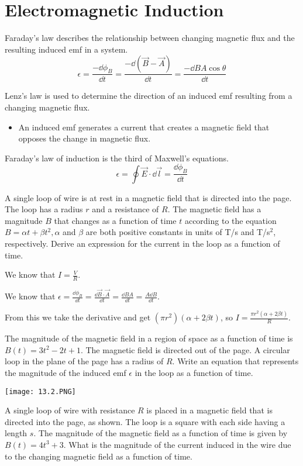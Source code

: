 \documentclass[../em.tex]{subfiles}
\begin{document}
\section{Electromagnetic Induction}
Faraday's law describes the relationship between changing magnetic flux and the resulting induced emf in a system.
\[\epsilon = \frac{-\dd\phi_B}{\dd t} = \frac{-\dd(\vec{B}-\vec{A})}{\dd t} = \frac{-\dd BA\cos\theta}{\dd t}\]

Lenz's law is used to determine the direction of an induced emf resulting from a changing magnetic flux.
\begin{itemize}
    \item An induced emf generates a current that creates a magnetic field that opposes the change in magnetic flux.
\end{itemize}

Faraday's law of induction is the third of Maxwell's equations.
\[ \epsilon = \oint \vec{E}\cdot\dd \vec{l} = \frac{\dd \phi_B}{\dd t}\]

\begin{example}
    A single loop of wire is at rest in a magnetic field that is directed into the page. The loop has a radius $r$ and a resistance of $R$. The magnetic field has a magnitude $B$ that changes 
    as a function of time $t$ according to the equation $B=\alpha t+\beta t^2, \alpha$ and $\beta$ are both positive constants in units of T/s and T/s$^2$, respectively. Derive an expression for the current in the loop as a function of time.

    We know that $I=\frac{V}{R}$.

    We know that $\epsilon = \frac{\dd \phi_B}{\dd t}=\frac{\dd \vec{B}\cdot \vec{A}}{\dd t}=\frac{\dd BA}{\dd t}=\frac{A\dd B}{\dd t}$.

    From this we take the derivative and get $(\pi r^2)(\alpha + 2\beta t)$, so $I=\frac{\pi r^2(\alpha +2\beta t)}{R}$.
\end{example}

\ex The magnitude of the magnetic field in a region of space as a function of time is $B(t)=3t^2-2t+1$. The magnetic field is directed out of the page. A circular loop in the plane of the page has a radius of $R$.
Write an equation that represents the magnitude of the induced emf $\epsilon$ in the loop as a function of time.

\ex \begin{center}
    \texttt{[image: 13.2.PNG]}
\end{center}
A single loop of wire with resistance $R$ is placed in a magnetic field that is directed into the page, as shown. The loop is a square with each side having a length $s$. The magnitude 
of the magnetic field as a function of time is given by $B(t)=4t^3+3$. What is the magnitude of the current induced in the wire due to the changing magnetic field as a function of time.
\end{document}
